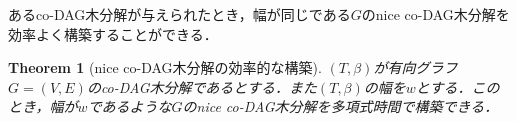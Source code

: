 \documentclass[master]{kuisthesis}		%
\theoremstyle{plain}
\newtheorem{theorem}{Theorem}
\theoremstyle{definition}
\begin{document}

あるco-DAG木分解が与えられたとき，幅が同じである$G$のnice co-DAG木分解を効率よく構築することができる．

\begin{theorem}[nice co-DAG木分解の効率的な構築]
    $(T, \beta)$が有向グラフ$G=(V, E)$のco-DAG木分解であるとする．また$(T, \beta)$の幅を$w$とする．このとき，幅が$w$であるような$G$のnice co-DAG木分解を多項式時間で構築できる．
\end{theorem}
\end{document}
